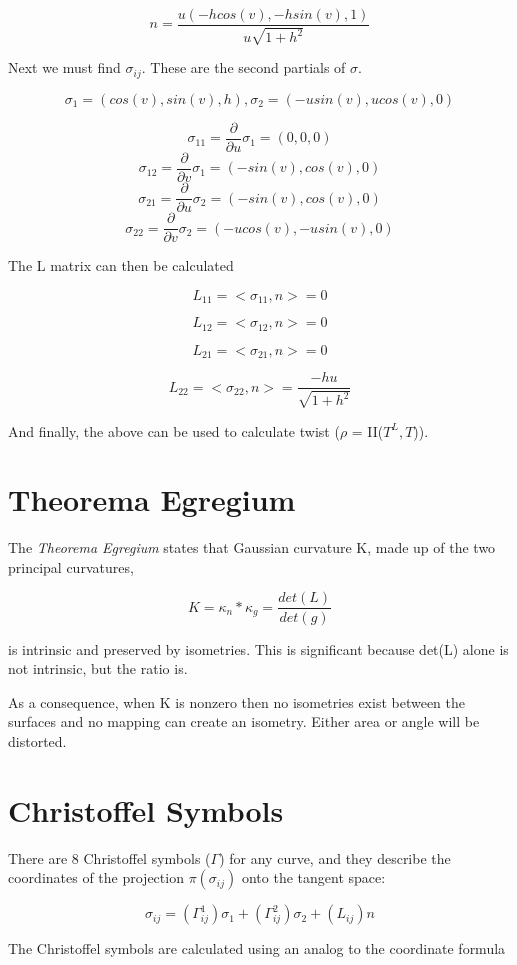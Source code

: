 \documentclass{article}
\begin{document}
\[n = \frac{u(-hcos(v), -hsin(v), 1)}{u \sqrt{1+h^2}} \] 

Next we must find $\sigma_{ij}$. These are the second partials of $\sigma$.

\[ \sigma_{1} = (cos(v), sin(v), h), \sigma_{2} = (-usin(v), ucos(v), 0) \]

\[ \sigma_{11} = \frac{\partial}{\partial u} \sigma_{1} = (0,0,0)\]
\[ \sigma_{12} = \frac{\partial}{\partial v} \sigma_{1} = (-sin(v),cos(v),0)\]
\[ \sigma_{21} = \frac{\partial}{\partial u} \sigma_{2} = (-sin(v),cos(v),0)\]
\[ \sigma_{22} = \frac{\partial}{\partial v} \sigma_{2} = (-ucos(v),-usin(v),0)\]

The L matrix can then be calculated

\[ L_{11} = <\sigma_{11}, n> = 0 \]

\[ L_{12} = <\sigma_{12}, n> = 0\]

\[ L_{21} = <\sigma_{21}, n> = 0\]

\[ L_{22} = <\sigma_{22}, n> = \frac{-hu}{\sqrt{1+h^2}} \]

And finally, the above can be used to calculate twist ($\rho$ = II($T^L, T$)).

\section{Theorema Egregium}

The {\it{Theorema Egregium}} states that Gaussian curvature K, made up of the two principal curvatures,

\[ K = \kappa_{n} * \kappa_{g} = \frac{det(L)}{det(g)}\]

is intrinsic and preserved by isometries. This is significant because det(L) alone is not intrinsic, but the ratio is.

As a consequence, when K is nonzero then no isometries exist between the surfaces and no mapping can create an isometry. Either area or angle will be distorted.


\section{Christoffel Symbols}

There are 8 Christoffel symbols ($\Gamma$) for any curve, and they describe the coordinates of the projection $\pi(\sigma_{ij})$ onto the tangent space:

\[ \sigma_{ij} = (\Gamma_{ij}^1)\sigma_1 + (\Gamma_{ij}^2)\sigma_2 + (L_{ij})n\]

The Christoffel symbols are calculated using an analog to the coordinate formula
\end{document}
